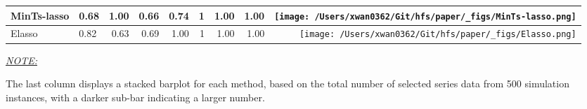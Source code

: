 \documentclass[11pt,a4paper,]{article}
\begin{document}
\begin{table}[!h]
{\begin{threeparttable}
\begin{tabular}{llrrrrrr>{}r}
MinTs-lasso & 0.68 & 1.00 & 0.66 & 0.74 & 1 & 1.00 & 1.00 & \texttt{[image: /Users/xwan0362/Git/hfs/paper/\_figs/MinTs-lasso.png]}\\
\midrule
Elasso & 0.82 & 0.63 & 0.69 & 1.00 & 1 & 1.00 & 1.00 & \texttt{[image: /Users/xwan0362/Git/hfs/paper/\_figs/Elasso.png]}\\
\bottomrule
\end{tabular}
\begin{tablenotes}[para]
\item \underline{\textit{NOTE:}} 
\item The last column displays a stacked barplot for each method, based on the total number of selected series data from 500 simulation instances, with a darker sub-bar indicating a larger number.
\end{tablenotes}
\end{threeparttable}}
\endgroup{}
\end{table}
\end{document}
